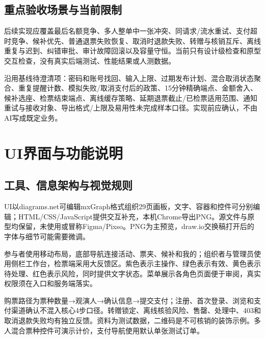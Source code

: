 \documentclass[UTF8,zihao=-4,fontset=windows]{ctexart}
\begin{document}
\subsection{重点验收场景与当前限制}
后续实现应覆盖最后名额竞争、多人整单中一张冲突、同请求/流水重试、支付超时竞争、候补优先、普通退票失败恢复、取消时退款失败、转赠与核销互斥、离线重复与迟到、纠错审批、审计故障回滚以及容量守恒。当前只有设计级检查和原型交互检查，没有真实后端测试、性能结果或人测数据。

沿用基线待澄清项：密码和账号找回、输入上限、过期发布计划、混合取消状态聚合、重复提醒计数、模拟失败/取消支付后的政策、15分钟精确端点、金额舍入、候补选座、检票结束端点、离线缓存策略、延期退票截止/已检票适用范围、通知重试与接收对象、导出格式/上限及易用性未完成样本口径。实现前应确认，不由AI写成既定业务。


\clearpage

\section{UI界面与功能说明}

\subsection{工具、信息架构与视觉规则}
UI以diagrams.net可编辑mxGraph格式组织29页画板，文字、容器和控件可分别编辑；HTML/CSS/JavaScript提供交互补充，本机Chrome导出PNG。源文件与原型均保留，未使用或冒称Figma/Pixso。PNG为主预览，draw.io交换稿打开后的字体与细节可能需要微调。

参与者使用移动布局，底部导航连接活动、票夹、候补和我的；组织者与管理员使用侧栏工作台，检票端采用大反馈区。紫色表示主操作、绿色表示有效、黄色表示待处理、红色表示风险，同时提供文字状态。菜单展示各角色页面便于审阅，真实权限须在入口和服务端落实。

购票路径为票种数量→观演人→确认信息→提交支付；注册、首次登录、浏览和支付渠道确认不混入核心4步口径。转赠锁定、离线核验风险、售罄、处理中、403和取消退款失败均有独立反馈。资料为测试数据，二维码是不可核销的装饰示例。多人混合票种控件可演示计价，支付导航使用默认单张测试订单。
\end{document}
